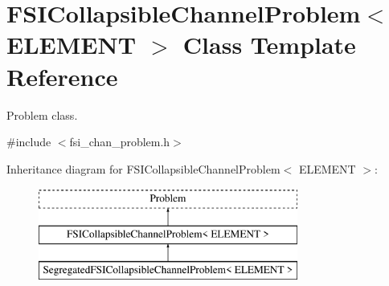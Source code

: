 \hypertarget{classFSICollapsibleChannelProblem}{}\section{F\+S\+I\+Collapsible\+Channel\+Problem$<$ E\+L\+E\+M\+E\+NT $>$ Class Template Reference}
\label{classFSICollapsibleChannelProblem}


Problem class.  




{\ttfamily \#include $<$fsi\+\_\+chan\+\_\+problem.\+h$>$}

Inheritance diagram for F\+S\+I\+Collapsible\+Channel\+Problem$<$ E\+L\+E\+M\+E\+NT $>$\+:\begin{figure}[H]
\begin{center}
\leavevmode
\includegraphics[height=3.000000cm]{classFSICollapsibleChannelProblem}
\end{center}
\end{figure}
